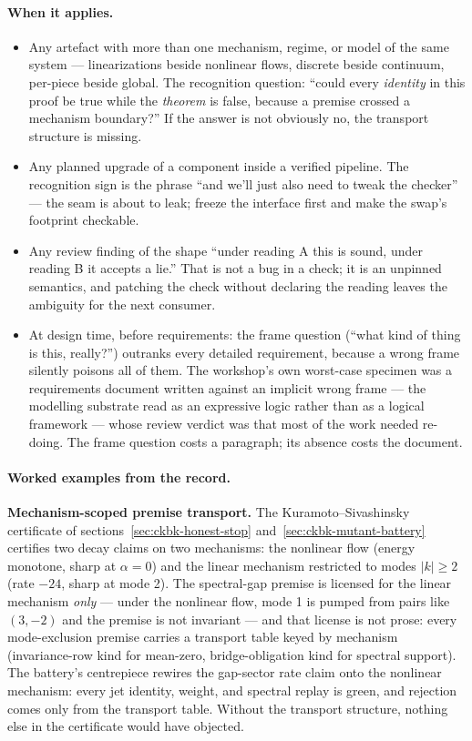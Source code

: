 \paragraph{When it applies.}
\begin{itemize}
\item Any artefact with more than one mechanism, regime, or model of
  the same system --- linearizations beside nonlinear flows, discrete
  beside continuum, per-piece beside global. The recognition question:
  ``could every \emph{identity} in this proof be true while the
  \emph{theorem} is false, because a premise crossed a mechanism
  boundary?'' If the answer is not obviously no, the transport
  structure is missing.
\item Any planned upgrade of a component inside a verified pipeline.
  The recognition sign is the phrase ``and we'll just also need to
  tweak the checker'' --- the seam is about to leak; freeze the
  interface first and make the swap's footprint checkable.
\item Any review finding of the shape ``under reading A this is sound,
  under reading B it accepts a lie.'' That is not a bug in a check; it
  is an unpinned semantics, and patching the check without declaring
  the reading leaves the ambiguity for the next consumer.
\item At design time, before requirements: the frame question (``what
  kind of thing is this, really?'') outranks every detailed
  requirement, because a wrong frame silently poisons all of them. The
  workshop's own worst-case specimen was a requirements document
  written against an implicit wrong frame --- the modelling substrate
  read as an expressive logic rather than as a logical framework ---
  whose review verdict was that most of the work needed re-doing. The
  frame question costs a paragraph; its absence costs the document.
\end{itemize}

\paragraph{Worked examples from the record.}

\textbf{Mechanism-scoped premise transport.} The
Kuramoto--Sivashinsky certificate of
sections~\ref{sec:ckbk-honest-stop} and~\ref{sec:ckbk-mutant-battery}
certifies two decay claims on two mechanisms: the nonlinear flow
(energy monotone, sharp at $\alpha = 0$) and the linear mechanism
restricted to modes $|k| \ge 2$ (rate $-24$, sharp at mode 2). The
spectral-gap premise is licensed for the linear mechanism \emph{only}
--- under the nonlinear flow, mode 1 is pumped from pairs like
$(3, -2)$ and the premise is not invariant --- and that license is not
prose: every mode-exclusion premise carries a transport table keyed by
mechanism (invariance-row kind for mean-zero, bridge-obligation kind
for spectral support). The battery's centrepiece rewires the gap-sector
rate claim onto the nonlinear mechanism: every jet identity, weight,
and spectral replay is green, and rejection comes only from the
transport table. Without the transport structure, nothing else in the
certificate would have objected.

